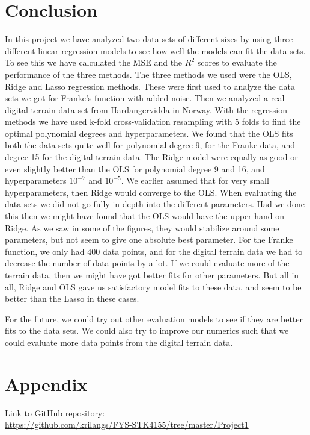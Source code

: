 \documentclass[12pt,a4paper,english]{article}
\begin{document}
\section{Conclusion}
In this project we have analyzed two data sets of different sizes by using three different linear regression models to see how well the models can fit the data sets. To see this we have calculated the MSE and the $R^2$ scores to evaluate the performance of the three methods. The three methods we used were the OLS, Ridge and Lasso regression methods. These were first used to analyze the data sets we got for Franke's function with added noise. Then we analyzed a real digital terrain data set from Hardangervidda in Norway. With the regression methods we have used k-fold cross-validation resampling with 5 folds to find the optimal polynomial degrees and hyperparameters. We found that the OLS fits both the data sets quite well for polynomial degree 9, for the Franke data, and degree 15 for the digital terrain data. The Ridge model were equally as good or even slightly better than the OLS for polynomial degree 9 and 16, and hyperparameters $10^{-7}$ and $10^{-5}$. We earlier assumed that for very small hyperparameters, then Ridge would converge to the OLS. When evaluating the data sets we did not go fully in depth into the different parameters. Had we done this then we might have found that the OLS would have the upper hand on Ridge. As we saw in some of the figures, they would stabilize around some parameters, but not seem to give one absolute best parameter. For the Franke function, we only had 400 data points, and for the digital terrain data we had to decrease the number of data points by a lot. If we could evaluate more of the terrain data, then we might have got better fits for other parameters. But all in all, Ridge and OLS gave us satisfactory model fits to these data, and seem to be better than the Lasso in these cases. 

For the future, we could try out other evaluation models to see if they are better fits to the data sets. We could also try to improve our numerics such that we could evaluate more data points from the digital terrain data.



\appendix
\section{Appendix}
\label{sect:appendix}
Link to GitHub repository:\\
\url{https://github.com/krilangs/FYS-STK4155/tree/master/Project1}
\end{document}

